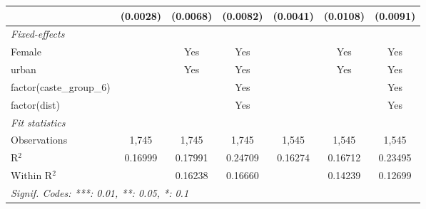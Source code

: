 \begin{table}[htbp]
{\begin{tabular}{lcccccc}
                                   & (0.0028)                & (0.0068)       & (0.0082)     & (0.0041)        & (0.0108)               & (0.0091)\\   
         \midrule
         \emph{Fixed-effects}\\
         Female                    &                         & Yes            & Yes          &                 & Yes                    & Yes\\  
         urban                     &                         & Yes            & Yes          &                 & Yes                    & Yes\\  
         factor(caste\_group\_6)   &                         &                & Yes          &                 &                        & Yes\\  
         factor(dist)              &                         &                & Yes          &                 &                        & Yes\\  
         \midrule
         \emph{Fit statistics}\\
         Observations              & 1,745                   & 1,745          & 1,745        & 1,545           & 1,545                  & 1,545\\  
         R$^2$                     & 0.16999                 & 0.17991        & 0.24709      & 0.16274         & 0.16712                & 0.23495\\  
         Within R$^2$              &                         & 0.16238        & 0.16660      &                 & 0.14239                & 0.12699\\  
         \midrule \midrule
         \multicolumn{7}{l}{\emph{Signif. Codes: ***: 0.01, **: 0.05, *: 0.1}}\\
      \end{tabular}}
\end{table}


